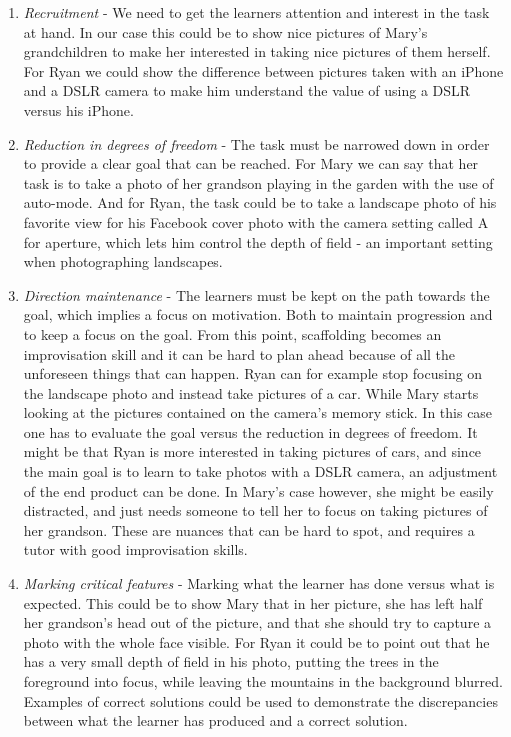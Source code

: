 \begin{enumerate}
\item{} \emph{Recruitment} - We need to get the learners attention and interest in the task at hand. In our case this could be to show nice pictures of Mary's grandchildren to make her interested in taking nice pictures of them herself. For Ryan we could show the difference between pictures taken with an iPhone and a DSLR camera to make him understand the value of using a DSLR versus his iPhone.

\item{} \emph{Reduction in degrees of freedom} - The task must be narrowed down in order to provide a clear goal that can be reached. For Mary we can say that her task is to take a photo of her grandson playing in the garden with the use of auto-mode. And for Ryan, the task could be to take a landscape photo of his favorite view for his Facebook cover photo with the camera setting called A for aperture, which lets him control the depth of field - an important setting when photographing landscapes. 

\item{} \emph{Direction maintenance} - The learners must be kept on the path towards the goal, which implies a focus on motivation. Both to maintain progression and to keep a focus on the goal. From this point, scaffolding becomes an improvisation skill and it can be hard to plan ahead because of all the unforeseen things that can happen. Ryan can for example stop focusing on the landscape photo and instead take pictures of a car. While Mary starts looking at the pictures contained on the camera's memory stick. In this case one has to evaluate the goal versus the reduction in degrees of freedom. It might be that Ryan is more interested in taking pictures of cars, and since the main goal is to learn to take photos with a DSLR camera, an adjustment of the end product can be done. In Mary's case however, she might be easily distracted, and just needs someone to tell her to focus on taking pictures of her grandson. These are nuances that can be hard to spot, and requires a tutor with good improvisation skills.

\item{} \emph{Marking critical features} - Marking what the learner has done versus what is expected. This could be to show Mary that in her picture, she has left half her grandson's head out of the picture, and that she should try to capture a photo with the whole face visible. For Ryan it could be to point out that he has a very small depth of field in his photo, putting the trees in the foreground into focus, while leaving the mountains in the background blurred. Examples of correct solutions could be used to demonstrate the discrepancies between what the learner has produced and a correct solution.


\end{enumerate}
